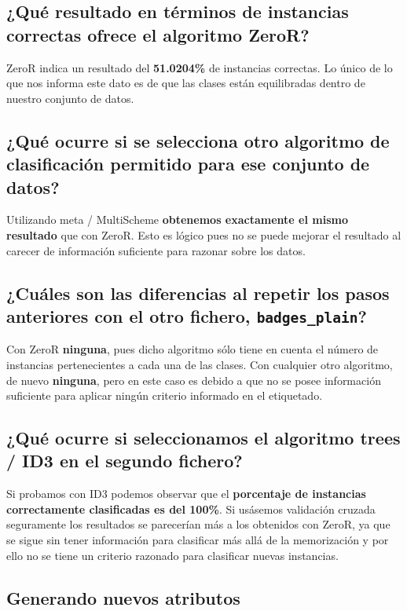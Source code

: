\documentclass[12pt]{article}
\begin{document}
\subsection*{\small ¿Qué resultado en términos de instancias correctas ofrece el
algoritmo ZeroR?}

ZeroR indica un resultado del \textbf{51.0204\%} de instancias correctas. Lo
único de lo que nos informa este dato es de que las clases están equilibradas
dentro de nuestro conjunto de datos.

\subsection*{\small ¿Qué ocurre si se selecciona otro algoritmo de clasificación
permitido para ese conjunto de datos?}

Utilizando meta / MultiScheme \textbf{obtenemos exactamente el mismo resultado}
que con ZeroR. Esto es lógico pues no se puede mejorar el resultado al carecer
de información suficiente para razonar sobre los datos.

\subsection*{\small ¿Cuáles son las diferencias al repetir los pasos anteriores
con el otro fichero, \texttt{badges\_plain}?}

Con ZeroR \textbf{ninguna}, pues dicho algoritmo sólo tiene en cuenta el número
de instancias pertenecientes a cada una de las clases.
Con cualquier otro algoritmo, de nuevo \textbf{ninguna}, pero en este caso es
debido a que no se posee información suficiente para aplicar ningún criterio
informado en el etiquetado.

\subsection*{\small ¿Qué ocurre si seleccionamos el algoritmo trees / ID3 en el
segundo fichero?}

Si probamos con ID3 podemos observar que el \textbf{porcentaje de instancias
correctamente clasificadas es del 100\%}. Si usásemos validación cruzada
seguramente los resultados se parecerían más a los obtenidos con ZeroR, ya que
se sigue sin tener información para clasificar más allá de la memorización y
por ello no se tiene un criterio razonado para clasificar nuevas instancias.

\newpage

\begin{center}
\section{Generando nuevos atributos}
\end{center}
\end{document}
